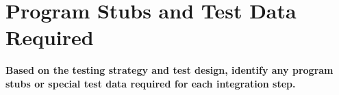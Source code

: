 \chapter{Program Stubs and Test Data Required}\label{chap:stubs}


\textbf{Based on the testing strategy and test design, identify any program stubs or special test data required for each integration step.}